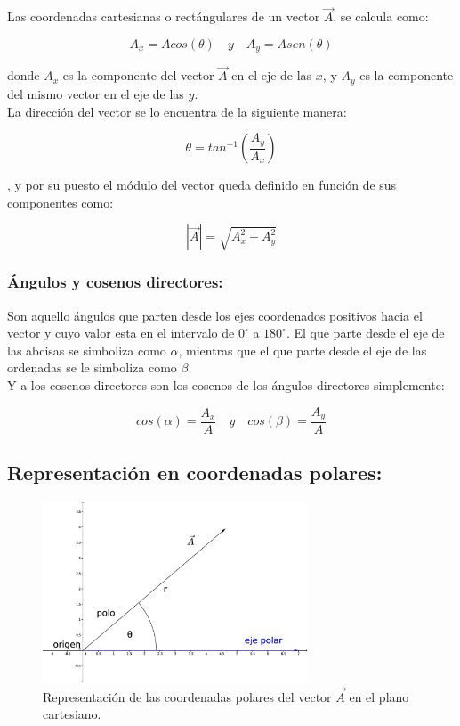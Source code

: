 Las coordenadas cartesianas o rectángulares de un vector $\vec{A}$, se calcula como:

\begin{equation}
A_x = Acos(\theta) \quad y \quad A_y = Asen(\theta) 
\end{equation}

donde $A_x$ es la componente del vector $\vec{A}$ en el eje de las $x$, y $A_y$ es la componente del mismo vector en el 
eje de las $y$.\\

La dirección del vector se lo encuentra de la siguiente manera:

\begin{equation}
 \theta = tan^{-1}(\frac{A_y}{A_x})
\end{equation}

, y por su puesto el módulo del vector queda definido en función de sus componentes como:

\begin{equation}
 |\vec{A}| = \sqrt{A_x^2 + A_y^2}
\end{equation}

\subsubsection{Ángulos y cosenos directores:}

Son aquello ángulos que parten desde los ejes coordenados positivos hacia el vector y cuyo valor esta en el intervalo 
de $0^\circ$ a $180^\circ$. El que parte desde el eje de las abcisas se simboliza como $\alpha$, mientras que el que 
parte desde el eje de las ordenadas se le simboliza como $\beta$.\\

Y a los cosenos directores son los cosenos de los ángulos directores simplemente:

\begin{equation}
 cos(\alpha) =\frac{A_x}{A}  \quad y \quad cos(\beta)=\frac{A_y}{A}
\end{equation}

\subsection{Representación en coordenadas polares:}

\begin{figure}[H]
   \centering
\includegraphics[width=0.7\textwidth]{images/vector_tres.eps}
  \caption{\small{Representación de las coordenadas polares del vector $\vec{A}$ en el plano cartesiano.}}
   \end{figure}

